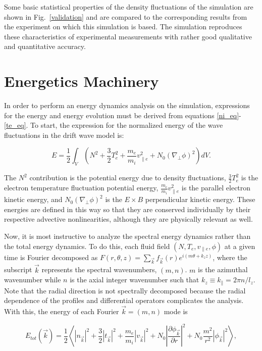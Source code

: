 \documentclass[showpacs,preprintnumbers,amsmath,amssymb,superscriptaddress,aip]{revtex4-1}
\def\beq{\begin{equation}}
\def\eeq{\end{equation}}
\def\para{\parallel}
\newcommand{\pdiff}[2]{\frac{\partial#1}{\partial#2}}
\def\grad{\nabla}
\newcommand{\gradperp}{\grad_\perp}
\newcommand{\vpe}{v_{\parallel e}}
\begin{document}
Some basic statistical properties of the density fluctuations of the
simulation are shown in Fig.~\ref{validation} and are  compared to the corresponding results from the experiment on which
this simulation is based. The simulation reproduces these characteristics of experimental measurements with rather good qualitative and quantitative accuracy.

\section{Energetics Machinery}
\label{sec_energetics_machinery}

In order to perform an energy dynamics analysis on the simulation, expressions for the energy and energy evolution must be derived from equations \ref{ni_eq}-\ref{te_eq}.
To start, the expression for the normalized energy of the wave fluctuations in the drift wave model is:

\beq
\label{energy_eq}
E = \frac{1}{2} \int_V  (N^2 + \frac{3}{2} T_e^2 + \frac{m_e}{m_i} \vpe^2 + N_0 (\gradperp \phi)^2 ) dV.
\eeq

The $N^2$ contribution is the potential energy due to density fluctuations, $\frac{3}{2} T_e^2$ is the electron temperature fluctuation potential energy,
$\frac{m_e}{m_i} \vpe^2$ is the parallel electron kinetic energy, and $N_0 (\gradperp \phi)^2$ is the $E \times B$ perpendicular kinetic energy.
These energies are defined in this way so that they are conserved individually by their respective advective nonlinearities, although they are physically relevant as well.

Now, it is most instructive to analyze the spectral energy dynamics rather than the total energy dynamics. 
To do this, each fluid field $(N,T_e,\vpe,\phi)$ at a given time is Fourier decomposed as 
$F(r,\theta,z) = \sum_{\vec{k}} f_{\vec{k}}(r) e^{i (m \theta + k_z z )}$,
where the subscript $\vec{k}$ represents the spectral wavenumbers, $(m,n)$. 
$m$ is the azimuthal wavenumber while $n$ is the axial integer wavenumber such that $k_z \equiv k_\para = 2 \pi n/l_z$. 
Note that the radial direction is not spectrally decomposed because the radial dependence of the profiles and differential operators complicates the analysis.
With this, the energy of each Fourier $\vec{k} = (m,n)$ mode is

\beq
\label{E_k}
E_{tot}(\vec{k}) = \frac{1}{2} \left< |n_{\vec{k}}|^2 + \frac{3}{2} |t_{\vec{k}}|^2 + \frac{m_e}{m_i} |v_{\vec{k}}|^2 + N_0 \left| \pdiff{\phi_{\vec{k}}}{r} \right|^2 + N_0 \frac{m^2}{r^2} |\phi_{\vec{k}}|^2 \right>,
\eeq
\end{document}
